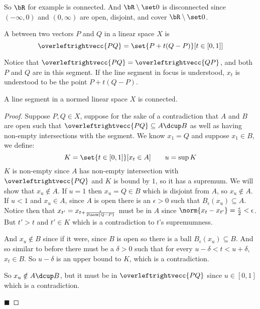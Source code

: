 \documentclass[10pt]{article}
\let\lineseg=\overleftrightvecc
\begin{document}
So $\bR$ for example is connected.
And $\bR\setminus\set0$ is disconnected since $(-\infty,0)$ and $(0,\infty)$ are open, disjoint, and cover $\bR\setminus\set0$.

\begin{defn*}

    A  between two vectors $P$ and $Q$ in a linear space $X$ is
    \[ \lineseg{PQ} = \set{P + t(Q - P)}[t\in{[0,1]}] \]

\end{defn*}

Notice that $\lineseg{PQ}=\lineseg{QP}$, and both $P$ and $Q$ are in this segment.
If the line segment in focus is understood, $x_t$ is understood to be the point $P + t(Q-P)$.

\begin{prop*}

    A line segment in a normed linear space $X$ is connected.

\end{prop*}

\begin{proof}

    Suppose $P,Q\in X$, suppose for the sake of a contradiction that $A$ and $B$ are open such that
    $\lineseg{PQ}\subseteq A\dcup B$ as well as having non-empty intersections with the segment.
    We know $x_1=Q$ and suppose $x_1\in B$, we define:
    \[ K = \set{t\in[0,1]}[x_t\in A] \qquad u =\sup K \]
    $K$ is non-empty since $A$ has non-empty intersection with $\lineseg{PQ}$ and $K$ is bound by $1$, so it has a supremum.
    We will show that $x_u\notin A$.
    If $u=1$ then $x_u=Q\in B$ which is disjoint from $A$, so $x_u\notin A$.
    If $u<1$ and $x_u\in A$, since $A$ is open there is an $\epsilon>0$ such that $B_{\epsilon}(x_u)\subseteq A$.
    Notice then that $x_{t'}=x_{t+\frac\epsilon{2\norm{Q-P}}}$ must be in $A$ since
    $\norm{x_t-x_{t'}} = \frac\epsilon2<\epsilon$.
    But $t'>t$ and $t'\in K$ which is a contradiction to $t$'s supremumness.

    And $x_u\notin B$ since if it were, since $B$ is open so there is a ball $B_\epsilon(x_u)\subseteq B$.
    And so similar to before there must be a $\delta>0$ such that for every $u-\delta<t<u+\delta$, $x_t\in B$.
    So $u-\delta$ is an upper bound to $K$, which is a contradiction.

    So $x_u\notin A\dcup B$, but it must be in $\lineseg{PQ}$ since $u\in[0,1]$ which is a contradiction.

    \hfill$\blacksquare$

\end{proof}
\end{document}
